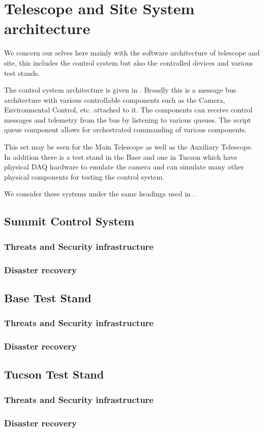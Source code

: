 \section{Telescope and Site  System architecture} \label{sec:tsarc}

 We concern our selves here mainly with the software architecture of telescope and site,
this includes the control system but also the controlled devices and various test stands.

The control system architecture is given in .
Broadly this is a message bus architecture with  various controllable components such as the Camera, Environmental Control, etc. attached to it.
The components can receive control messages and telemetry from the bus by listening to various queues.
The script queue component allows for orchestrated commanding of various components.

This set may be seen for the Main Telescope as well as the Auxiliary Telescope.
In addition there is a test stand in the Base and one in Tucson which have physical DAQ hardware to emulate the camera and can simulate many other physical components for testing the control system.

We consider these systems under the same headings used in .





\subsection{Summit Control System}
\subsubsection{Threats and Security infrastructure}
\subsubsection{Disaster recovery}

\subsection{Base Test Stand}
\subsubsection{Threats and Security infrastructure}
\subsubsection{Disaster recovery}

\subsection{Tucson Test Stand}
\subsubsection{Threats and Security infrastructure}
\subsubsection{Disaster recovery}

